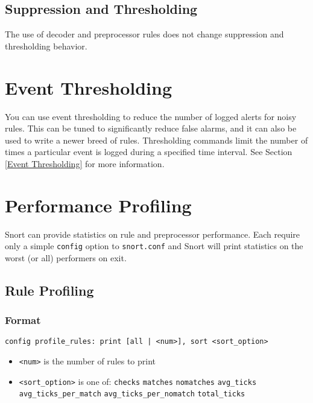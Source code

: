\documentclass[english]{report}
\begin{document}
\subsection{Suppression and Thresholding}
The use of decoder and preprocessor rules does not change suppression
and thresholding behavior.


\section{Event Thresholding}
You can use event thresholding to reduce the number of logged alerts for noisy
rules.  This can be tuned to significantly reduce false alarms, and it can also
be used to write a newer breed of rules. Thresholding commands limit the number
of times a particular event is logged during a specified time interval. See Section \ref{Event Thresholding} for more information.

\section{Performance Profiling}

Snort can provide statistics on rule and preprocessor performance.  Each require only a
simple \texttt{config} option to \texttt{snort.conf} and Snort will print statistics on the worst (or all) performers
on exit.

\subsection{Rule Profiling\label{rule profiling}}

\subsubsection{Format}
\texttt{config profile\_rules: print [all | <num>], sort <sort\_option>}
\begin{itemize}
\item \texttt{<num>} is the number of rules to print
\item \texttt{<sort\_option>} is one of:
    \subitem \texttt{checks}
    \subitem \texttt{matches}
    \subitem \texttt{nomatches}
    \subitem \texttt{avg\_ticks}
    \subitem \texttt{avg\_ticks\_per\_match}
    \subitem \texttt{avg\_ticks\_per\_nomatch}
    \subitem \texttt{total\_ticks}
\end{itemize}
\end{document}
